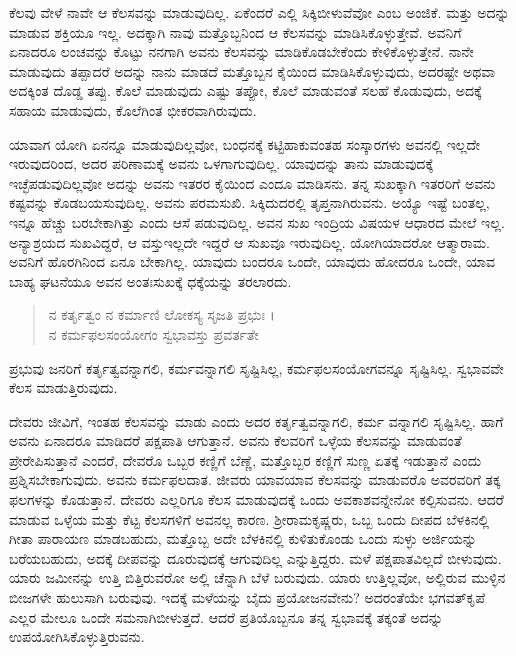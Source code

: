 ಕೆಲವು ವೇಳೆ ನಾವೇ ಆ ಕೆಲಸವನ್ನು ಮಾಡುವುದಿಲ್ಲ. ಏಕೆಂದರೆ ಎಲ್ಲಿ ಸಿಕ್ಕಿಬೀಳುವೆವೋ ಎಂಬ ಅಂಜಿಕೆ. ಮತ್ತು ಅದನ್ನು ಮಾಡುವ ಶಕ್ತಿಯೂ ಇಲ್ಲ. ಅದಕ್ಕಾಗಿ ನಾವು ಮತ್ತೊಬ್ಬನಿಂದ ಆ ಕೆಲಸವನ್ನು ಮಾಡಿಸಿಕೊಳ್ಳುತ್ತೇವೆ. ಅವನಿಗೆ ಏನಾದರೂ ಲಂಚವನ್ನು ಕೊಟ್ಟು ನನಗಾಗಿ ಅವನು ಕೆಲಸವನ್ನು ಮಾಡಿಕೊಡಬೇಕೆಂದು ಕೇಳಿಕೊಳ್ಳುತ್ತೇನೆ. ನಾನೇ ಮಾಡುವುದು ತಪ್ಪಾದರೆ ಅದನ್ನು ನಾನು ಮಾಡದೆ ಮತ್ತೊಬ್ಬನ ಕೈಯಿಂದ ಮಾಡಿಸಿಕೊಳ್ಳುವುದು, ಅದರಷ್ಟೇ ಅಥವಾ ಅದಕ್ಕಿಂತ ದೊಡ್ಡ ತಪ್ಪು. ಕೊಲೆ ಮಾಡುವುದು ಎಷ್ಟು ತಪ್ಪೋ, ಕೊಲೆ ಮಾಡುವಂತೆ ಸಲಹೆ ಕೊಡುವುದು, ಅದಕ್ಕೆ ಸಹಾಯ ಮಾಡುವುದು, ಕೊಲೆಗಿಂತ ಭೀಕರವಾಗಿರುವುದು.

ಯಾವಾಗ ಯೋಗಿ ಏನನ್ನೂ ಮಾಡುವುದಿಲ್ಲವೋ, ಬಂಧನಕ್ಕೆ ಕಟ್ಟಿಹಾಕುವಂತಹ ಸಂಸ್ಕಾರಗಳು ಅವನಲ್ಲಿ ಇಲ್ಲದೇ ಇರುವುದರಿಂದ, ಅದರ ಪರಿಣಾಮಕ್ಕೆ ಅವನು ಒಳಗಾಗುವುದಿಲ್ಲ. ಯಾವುದನ್ನು ತಾನು ಮಾಡುವುದಕ್ಕೆ ಇಚ್ಛೆಪಡುವುದಿಲ್ಲವೋ ಅದನ್ನು ಅವನು ಇತರರ ಕೈಯಿಂದ ಎಂದೂ ಮಾಡಿಸನು. ತನ್ನ ಸುಖಕ್ಕಾಗಿ ಇತರರಿಗೆ ಅವನು ಕಷ್ಟವನ್ನು ಕೊಡಬಯಸುವುದಿಲ್ಲ. ಅವನು ಪರಮಸುಖಿ. ಸಿಕ್ಕಿದುದರಲ್ಲಿ ತೃಪ್ತನಾಗಿರುವನು. ಅಯ್ಯೊ ಇಷ್ಟೆ ಬಂತಲ್ಲ, ಇನ್ನೂ ಹೆಚ್ಚು ಬರಬೇಕಾಗಿತ್ತು ಎಂದು ಆಸೆ ಪಡುವುದಿಲ್ಲ. ಅವನ ಸುಖ ಇಂದ್ರಿಯ ವಿಷಯಳ ಆಧಾರದ ಮೇಲೆ ಇಲ್ಲ. ಅನ್ಯಾಶ್ರಯದ ಸುಖವಿದ್ದರೆ, ಆ ವಸ್ತುಇಲ್ಲದೇ ಇದ್ದರೆ ಆ ಸುಖವೂ ಇರುವುದಿಲ್ಲ. ಯೋಗಿಯಾದರೋ ಆತ್ಮಾರಾಮ. ಅವನಿಗೆ ಹೊರಗಿನಿಂದ ಏನೂ ಬೇಕಾಗಿಲ್ಲ. ಯಾವುದು ಬಂದರೂ ಒಂದೇ, ಯಾವುದು ಹೋದರೂ ಒಂದೇ, ಯಾವ ಬಾಹ್ಯ ಘಟನೆಯೂ ಅವನ ಅಂತಃಸುಖಕ್ಕೆ ಧಕ್ಕೆಯನ್ನು ತರಲಾರದು.

\begin{verse}
ನ ಕರ್ತೃತ್ವಂ ನ ಕರ್ಮಾಣಿ ಲೋಕಸ್ಯ ಸೃಜತಿ ಪ್ರಭುಃ ।\\ನ ಕರ್ಮಫಲಸಂಯೋಗಂ ಸ್ವಭಾವಸ್ತು ಪ್ರವರ್ತತೇ 
\end{verse}

{\small ಪ್ರಭುವು ಜನರಿಗೆ ಕರ್ತೃತ್ವವನ್ನಾಗಲಿ, ಕರ್ಮವನ್ನಾಗಲಿ ಸೃಷ್ಟಿಸಿಲ್ಲ, ಕರ್ಮಫಲಸಂಯೋಗವನ್ನೂ ಸೃಷ್ಟಿಸಿಲ್ಲ. ಸ್ವಭಾವವೇ ಕೆಲಸ ಮಾಡುತ್ತಿರುವುದು.}

ದೇವರು ಜೀವಿಗೆ, ಇಂತಹ ಕೆಲಸವನ್ನು ಮಾಡು ಎಂದು ಅದರ ಕರ್ತೃತ್ವವನ್ನಾಗಲಿ, ಕರ್ಮ ವನ್ನಾಗಲಿ ಸೃಷ್ಟಿಸಿಲ್ಲ. ಹಾಗೆ ಅವನು ಏನಾದರೂ ಮಾಡಿದರೆ ಪಕ್ಷಪಾತಿ ಆಗುತ್ತಾನೆ. ಅವನು ಕೆಲವರಿಗೆ ಒಳ್ಳೆಯ ಕೆಲಸವನ್ನು ಮಾಡುವಂತೆ ಪ್ರೇರೇಪಿಸುತ್ತಾನೆ ಎಂದರೆ, ದೇವರೊ ಒಬ್ಬರ ಕಣ್ಣಿಗೆ ಬೆಣ್ಣೆ, ಮತ್ತೊಬ್ಬರ ಕಣ್ಣಿಗೆ ಸುಣ್ಣ ಏತಕ್ಕೆ ಇಡುತ್ತಾನೆ ಎಂದು ಪ್ರಶ್ನಿಸಬೇಕಾಗುವುದು. ಅವನು ಕರ್ಮಫಲದಾತ. ಜೀವರು ಯಾವಯಾವ ಕೆಲಸವನ್ನು ಮಾಡುವರೊ ಅವರವರಿಗೆ ತಕ್ಕ ಫಲಗಳನ್ನು ಕೊಡುತ್ತಾನೆ. ದೇವರು ಎಲ್ಲರಿಗೂ ಕೆಲಸ ಮಾಡುವುದಕ್ಕೆ ಒಂದು ಅವಕಾಶವನ್ನೇನೋ ಕಲ್ಪಿಸುವನು. ಆದರೆ ಮಾಡುವ ಒಳ್ಳೆಯ ಮತ್ತು ಕೆಟ್ಟ ಕೆಲಸಗಳಿಗೆ ಅವನಲ್ಲ ಕಾರಣ. ಶ್ರೀರಾಮಕೃಷ್ಣರು, ಒಬ್ಬ ಒಂದು ದೀಪದ ಬೆಳಕಿನಲ್ಲಿ ಗೀತಾ ಪಾರಾಯಣ ಮಾಡಬಹುದು, ಮತ್ತೊಬ್ಬ ಅದೇ ಬೆಳಕಿನಲ್ಲಿ ಕುಳಿತುಕೊಂಡು ಒಂದು ಸುಳ್ಳು ಅರ್ಜಿಯನ್ನು ಬರೆಯಬಹುದು, ಅದಕ್ಕೆ ದೀಪವನ್ನು ದೂರುವುದಕ್ಕೆ ಆಗುವುದಿಲ್ಲ ಎನ್ನುತ್ತಿದ್ದರು. ಮಳೆ ಪಕ್ಷಪಾತವಿಲ್ಲದೆ ಬೀಳುವುದು. ಯಾರು ಜಮೀನನ್ನು ಉತ್ತಿ ಬಿತ್ತಿರುವರೋ ಅಲ್ಲಿ ಚೆನ್ನಾಗಿ ಬೆಳೆ ಬರುವುದು. ಯಾರು ಉತ್ತಿಲ್ಲವೋ, ಅಲ್ಲಿರುವ ಮುಳ್ಳಿನ ಬೀಜಗಳೇ ಹುಲುಸಾಗಿ ಬರುವುವು. ಇದಕ್ಕೆ ಮಳೆಯನ್ನು ಬೈದು ಪ್ರಯೋಜನವೇನು? ಅದರಂತೆಯೇ ಭಗವತ್​ಕೃಪೆ ಎಲ್ಲರ ಮೇಲೂ ಒಂದೇ ಸಮನಾಗಿಬೀಳುತ್ತದೆ. ಆದರೆ ಪ್ರತಿಯೊಬ್ಬನೂ ತನ್ನ ಸ್ವಭಾವಕ್ಕೆ ತಕ್ಕಂತೆ ಅದನ್ನು ಉಪಯೋಗಿಸಿಕೊಳ್ಳುತ್ತಿರುವನು.

